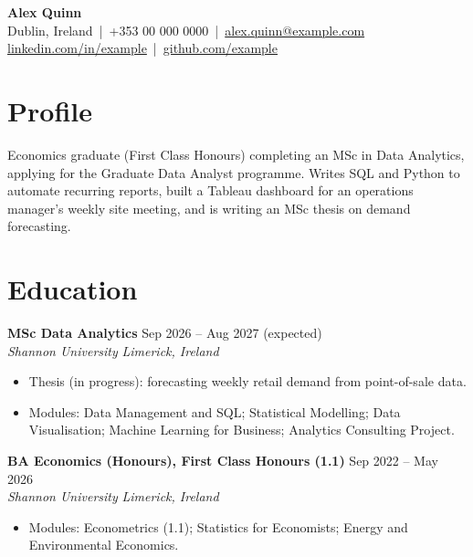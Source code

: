 \documentclass[11pt,a4paper]{article}
\newcommand{\entry}[4]{\textbf{#1} \hfill #2\\ \textit{#3} \hfill \textit{#4}\par}
\begin{document}
{\centering
{\LARGE\bfseries Alex Quinn}\\[3pt]
Dublin, Ireland \,|\, +353 00 000 0000 \,|\, \href{mailto:alex.quinn@example.com}{alex.quinn@example.com}\\
\href{https://linkedin.com/in/example}{linkedin.com/in/example} \,|\, \href{https://github.com/example}{github.com/example}\par}

\section{Profile}
Economics graduate (First Class Honours) completing an MSc in Data Analytics, applying for the Graduate Data Analyst programme. Writes SQL and Python to automate recurring reports, built a Tableau dashboard for an operations manager's weekly site meeting, and is writing an MSc thesis on demand forecasting.

\section{Education}
\entry{MSc Data Analytics}{Sep 2026 -- Aug 2027 (expected)}{Shannon University}{Limerick, Ireland}
\begin{itemize}
  \item Thesis (in progress): forecasting weekly retail demand from point-of-sale data.
  \item Modules: Data Management and SQL; Statistical Modelling; Data Visualisation; Machine Learning for Business; Analytics Consulting Project.
\end{itemize}

\vspace{4pt}
\entry{BA Economics (Honours), First Class Honours (1.1)}{Sep 2022 -- May 2026}{Shannon University}{Limerick, Ireland}
\begin{itemize}
  \item Modules: Econometrics (1.1); Statistics for Economists; Energy and Environmental Economics.
\end{itemize}

\end{document}
